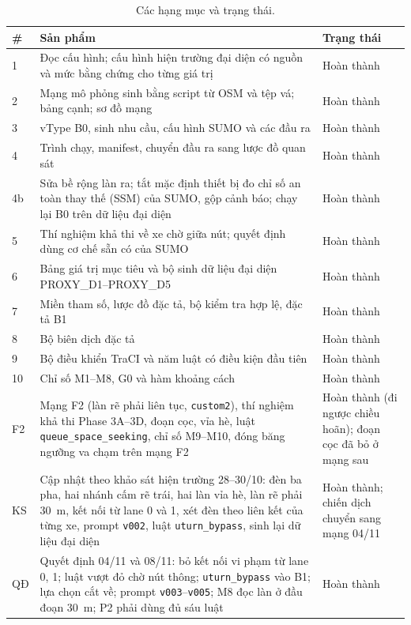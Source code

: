 \documentclass[../main.tex]{subfiles}
\begin{document}
\begin{table}[H]
\centering
\small
\caption{Các hạng mục và trạng thái.} \label{table:4.4}
\begin{tabular}{|p{0.8cm}|p{9.6cm}|p{2.6cm}|}
\hline
\textbf{\#} & \textbf{Sản phẩm} & \textbf{Trạng thái} \\ \hline
1 & Đọc cấu hình; cấu hình hiện trường đại diện có nguồn và mức bằng chứng cho từng giá trị & Hoàn thành \\ \hline
2 & Mạng mô phỏng sinh bằng script từ OSM và tệp vá; bảng cạnh; sơ đồ mạng & Hoàn thành \\ \hline
3 & vType B0, sinh nhu cầu, cấu hình SUMO và các đầu ra & Hoàn thành \\ \hline
4 & Trình chạy, manifest, chuyển đầu ra sang lược đồ quan sát & Hoàn thành \\ \hline
4b & Sửa bề rộng làn ra; tắt mặc định thiết bị đo chỉ số an toàn thay thế (SSM) của SUMO, gộp cảnh báo; chạy lại B0 trên dữ liệu đại diện & Hoàn thành \\ \hline
5 & Thí nghiệm khả thi về xe chờ giữa nút; quyết định dùng cơ chế sẵn có của SUMO & Hoàn thành \\ \hline
6 & Bảng giá trị mục tiêu và bộ sinh dữ liệu đại diện PROXY\_D1--PROXY\_D5 & Hoàn thành \\ \hline
7 & Miền tham số, lược đồ đặc tả, bộ kiểm tra hợp lệ, đặc tả B1 & Hoàn thành \\ \hline
8 & Bộ biên dịch đặc tả & Hoàn thành \\ \hline
9 & Bộ điều khiển TraCI và năm luật có điều kiện đầu tiên & Hoàn thành \\ \hline
10 & Chỉ số M1--M8, G0 và hàm khoảng cách & Hoàn thành \\ \hline
F2 & Mạng F2 (làn rẽ phải liên tục, \texttt{custom2}), thí nghiệm khả thi Phase 3A--3D, đoạn cọc, vỉa hè, luật \texttt{queue\_space\_seeking}, chỉ số M9--M10, đóng băng ngưỡng va chạm trên mạng F2 & Hoàn thành (đi ngược chiều hoãn); đoạn cọc đã bỏ ở mạng sau \\ \hline
KS & Cập nhật theo khảo sát hiện trường 28--30/10: đèn ba pha, hai nhánh cấm rẽ trái, hai làn vỉa hè, làn rẽ phải 30~m, kết nối từ lane 0 và 1, xét đèn theo liên kết của từng xe, prompt \texttt{v002}, luật \texttt{uturn\_bypass}, sinh lại dữ liệu đại diện & Hoàn thành; chiến dịch chuyển sang mạng 04/11 \\ \hline
QĐ & Quyết định 04/11 và 08/11: bỏ kết nối vi phạm từ lane 0, 1; luật vượt đỏ chờ nút thông; \texttt{uturn\_bypass} vào B1; lựa chọn cắt về; prompt \texttt{v003}--\texttt{v005}; M8 đọc làn ở đầu đoạn 30~m; P2 phải dùng đủ sáu luật & Hoàn thành \\ \hline

\end{tabular}
\end{table}
\end{document}
